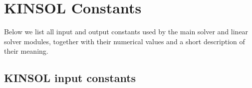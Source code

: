 \chapter{KINSOL Constants}\label{c:constants}

Below we list all input and output constants used by the main solver and 
linear solver modules, together with their numerical values and a short
description of their meaning.


\newlength{\tcolone}
\newlength{\tcoltwo}
\settowidth{\tcoltwo}{-20}
\newlength{\tcolthree}
\setlength{\tcolthree}{\textwidth}
\addtolength{\tcolthree}{-0.5in}
\addtolength{\tcolthree}{-\tcolone}
\addtolength{\tcolthree}{-\tcoltwo}

\tablefirsthead{}
\tablehead{}
\tabletail{}
\tablelasttail{}


\section{KINSOL input constants}\label{s:kinsol_in_constants}

